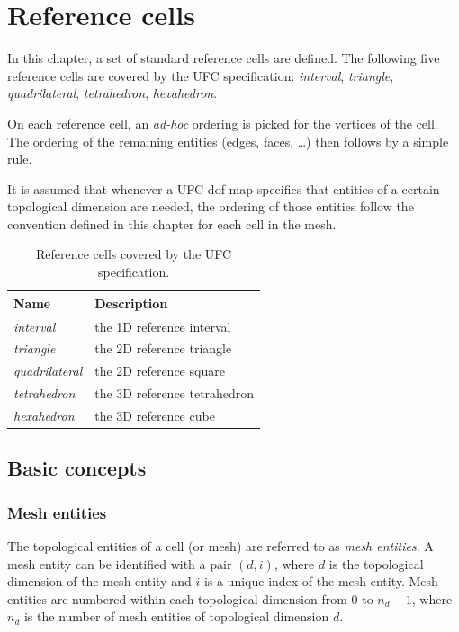 \chapter{Reference cells}

In this chapter, a set of standard reference cells are defined.
The following five reference cells are covered by the UFC specification:
\emph{interval},
\emph{triangle},
\emph{quadrilateral},
\emph{tetrahedron},
\emph{hexahedron}.

On each reference cell, an \emph{ad-hoc} ordering is picked for the
vertices of the cell. The ordering of the remaining entities (edges,
faces, \ldots) then follows by a simple rule.

It is assumed that whenever a UFC dof map specifies that entities of a
certain topological dimension are needed, the ordering of those
entities follow the convention defined in this chapter for each cell
in the mesh.

\begin{table}[H]
  \begin{center}
    \begin{tabular}{|l|l|}
      \hline
      Name & Description \\
      \hline
      \hline
      \emph{interval}      & the 1D reference interval \\
      \hline
      \emph{triangle}      & the 2D reference triangle \\
      \hline
      \emph{quadrilateral} & the 2D reference square \\
      \hline
      \emph{tetrahedron}   & the 3D reference tetrahedron \\
      \hline
      \emph{hexahedron}    & the 3D reference cube \\
      \hline
    \end{tabular}
    \caption{Reference cells covered by the UFC specification.}
  \end{center}
\end{table}

\section{Basic concepts}

\subsection{Mesh entities}

The topological entities of a cell (or mesh) are referred to as
\emph{mesh entities}. A mesh entity can be identified with a pair
$(d, i)$, where $d$ is the topological dimension of the mesh entity and $i$
is a unique index of the mesh entity. Mesh entities are numbered
within each topological dimension from $0$ to $n_d-1$, where $n_d$ is
the number of mesh entities of topological dimension $d$.

